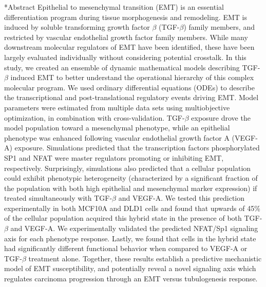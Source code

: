 \documentclass[12pt]{article}
\makeatletter
\renewcommand\section{\@startsection
	{subsection}{2}{0mm}
	{-0.2in}
	{0.05\baselineskip}
	{\normalfont\large\bfseries}}
\makeatother
\begin{document}
\section*{Abstract}
Epithelial to mesenchymal transition (EMT) is an essential differentiation program during tissue morphogenesis and remodeling.
EMT is induced by soluble transforming growth factor $\beta$ (TGF-$\beta$) family members, and restricted by vascular endothelial growth factor family members.
While many downstream molecular regulators of EMT have been identified, these have been largely evaluated individually without considering potential crosstalk.
In this study, we created an ensemble of dynamic mathematical models describing TGF-$\beta$ induced EMT to better understand the operational hierarchy of this complex molecular program.
We used ordinary differential equations (ODEs) to describe the transcriptional and post-translational regulatory events driving EMT.
Model parameters were estimated from multiple data sets using multiobjective optimization, in combination with cross-validation.
TGF-$\beta$ exposure drove the model population toward a mesenchymal phenotype, while an epithelial phenotype was enhanced following vascular endothelial growth factor A (VEGF-A) exposure.
Simulations predicted that the transcription factors phosphorylated SP1 and NFAT were master regulators promoting or inhibiting EMT, respectively.
Surprisingly, simulations also predicted that a cellular population could exhibit phenotypic heterogeneity (characterized by a significant fraction of the population with both high epithelial and mesenchymal marker expression)
if treated simultaneously with TGF-$\beta$ and VEGF-A.  We tested this prediction experimentally in both MCF10A and DLD1 cells and found that upwards of 45\% of the cellular population acquired this hybrid state in the presence of both TGF-$\beta$ and VEGF-A.
We experimentally validated the predicted NFAT/Sp1 signaling axis for each phenotype response. Lastly, we found that cells in the hybrid state had significantly different functional behavior when compared to VEGF-A or TGF-$\beta$ treatment alone.
Together, these results establish a predictive mechanistic model of EMT susceptibility, and potentially reveal a novel signaling axis which regulates carcinoma progression through an EMT versus tubulogenesis response.
\end{document}
